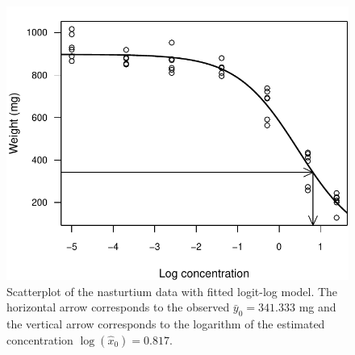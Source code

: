 \documentclass[cmfont,usenames,dvipsnames,leqno]{afit-etd}\usepackage[]{graphicx}\usepackage[]{color}
\makeatletter
\def\maxwidth{ %
  \ifdim\Gin@nat@width>\linewidth
    \linewidth
  \else
    \Gin@nat@width
  \fi
}
\newenvironment{knitrout}{}{} %
\renewenvironment{knitrout}{\begin{singlespace}}{\end{singlespace}}
\newcommand{\wh}[1]{\ensuremath{\widehat{#1}}}
\makeatother
\begin{document}
\begin{knitrout}
\color{fgcolor}\begin{figure}[H]

\includegraphics[width=\maxwidth]{figure/nasturtium-scatter} \caption[Scatterplot of the nasturtium data]{Scatterplot of the nasturtium data with fitted logit-log model. The horizontal arrow corresponds to the observed $\bar{y}_0 = 341.333$ mg and the vertical arrow corresponds to the logarithm of the estimated concentration $\log(\wh{x}_0) = 0.817$.\label{fig:nasturtium-scatter}}
\end{figure}


\end{knitrout}
\end{document}
